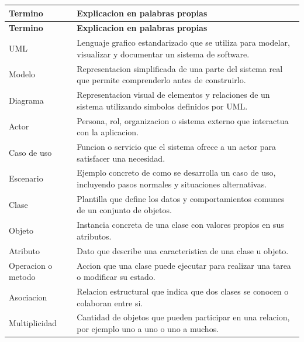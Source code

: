 \documentclass[12pt,letterpaper]{article}
\begin{document}
\begin{longtable}{|p{3.8cm}|p{11.1cm}|}
\hline
\textbf{Termino} & \textbf{Explicacion en palabras propias} \\
\hline
\endfirsthead
\hline
\textbf{Termino} & \textbf{Explicacion en palabras propias} \\
\hline
\endhead
\hline
\endfoot
\hline
\endlastfoot

UML & Lenguaje grafico estandarizado que se utiliza para modelar, visualizar y documentar un sistema de software. \\
\hline

Modelo & Representacion simplificada de una parte del sistema real que permite comprenderlo antes de construirlo. \\
\hline

Diagrama & Representacion visual de elementos y relaciones de un sistema utilizando simbolos definidos por UML. \\
\hline

Actor & Persona, rol, organizacion o sistema externo que interactua con la aplicacion. \\
\hline

Caso de uso & Funcion o servicio que el sistema ofrece a un actor para satisfacer una necesidad. \\
\hline

Escenario & Ejemplo concreto de como se desarrolla un caso de uso, incluyendo pasos normales y situaciones alternativas. \\
\hline

Clase & Plantilla que define los datos y comportamientos comunes de un conjunto de objetos. \\
\hline

Objeto & Instancia concreta de una clase con valores propios en sus atributos. \\
\hline

Atributo & Dato que describe una caracteristica de una clase u objeto. \\
\hline

Operacion o metodo & Accion que una clase puede ejecutar para realizar una tarea o modificar su estado. \\
\hline

Asociacion & Relacion estructural que indica que dos clases se conocen o colaboran entre si. \\
\hline

Multiplicidad & Cantidad de objetos que pueden participar en una relacion, por ejemplo uno a uno o uno a muchos. \\
\hline


\end{longtable}
\end{document}
